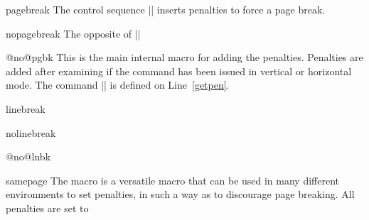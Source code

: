   \begin{docCommand}{pagebreak}{}
  The control sequence |\pagebreak| inserts penalties to force a page break.
    \end{docCommand}
    \begin{teX}
 \def\pagebreak{\@testopt{\@no@pgbk-}4}   
    \end{teX}
  \begin{docCommand}{nopagebreak}{}
  The opposite of |\pagebreak|
    \begin{teX}

\def\nopagebreak{\@testopt\@no@pgbk4}
    \end{teX}

  \begin{docCommand}{@no@pgbk}{}
This is the main internal macro for adding the penalties. Penalties are
added after examining if the command has been issued in vertical or
horizontal mode. The command |\@getpen| is defined on Line~\ref{getpen}.
    \begin{teX}
\def\@no@pgbk #1[#2]{%
  \ifvmode
    \penalty #1\@getpen{#2}%
  \else
    \@bsphack
    \vadjust{\penalty #1\@getpen{#2}}%
    \@esphack
  \fi}
    \end{teX}
  \end{docCommand}
\end{docCommand}
%
  \begin{docCommand}{linebreak}{}
  \begin{docCommand}{nolinebreak}{}
    \begin{teX}
\def\linebreak{\@testopt{\@no@lnbk-}4}
\def\nolinebreak{\@testopt\@no@lnbk4}
    \end{teX}
  \end{docCommand}
  \end{docCommand}
  \begin{docCommand}{@no@lnbk}{}
    \begin{teX}
\def\@no@lnbk #1[#2]{%
  \ifvmode
    \@nolnerr
  \else
    \@tempskipa\lastskip
    \unskip
    \penalty #1\@getpen{#2}%
    \ifdim\@tempskipa>\z@
      \hskip\@tempskipa
      \ignorespaces
    \fi
  \fi}
    \end{teX}
  \end{docCommand}

%
  \begin{docCommand}{samepage}{}
  The macro  is a versatile macro that can be used in many different environments to 
  set penalties, in such a way as to discourage page breaking. All penalties are set to 
    \begin{teX}
\def\samepage{\interlinepenalty\@M
   \postdisplaypenalty\@M
   \interdisplaylinepenalty\@M
   \@beginparpenalty\@M
   \@endparpenalty\@M
   \@itempenalty\@M
   \@secpenalty\@M
   \interfootnotelinepenalty\@M}
    \end{teX}
  \end{docCommand}
  

